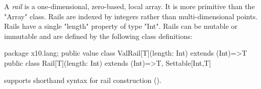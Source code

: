 A \emph{rail} is a one-dimensional, zero-based, local array. 
It is more primitive than the \xcd"Array" class.
Rails are indexed by integers rather than multi-dimensional
points.  Rails have a single \xcd"length" property of type
\xcd"Int".  Rails can be mutable or immutable and are defined
by the following class definitions:

\begin{xten}
package x10.lang;
public value class ValRail[T](length: Int) extends (Int)=>T { }
public class Rail[T](length: Int) extends (Int)=>T, Settable[Int,T] { }
\end{xten}

\Xten{} supports shorthand syntax for rail construction
().

